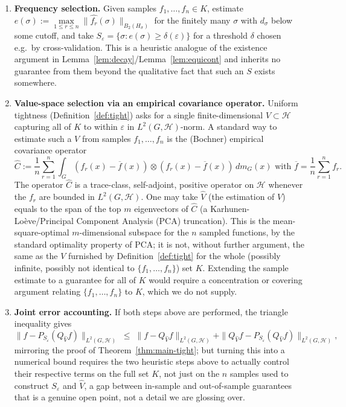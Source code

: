 \documentclass[11pt]{amsart}
\begin{document}
\begin{enumerate}
\item \textbf{Frequency selection.} Given samples $f_1,\dots,f_n\in K$, estimate
$e(\sigma) := \max\limits_{1\le r\le n} \|\widehat{f_r}(\sigma)\|_{B_2(H_\sigma)}$
for the finitely many $\sigma$ with $d_\sigma$ below some cutoff, and take
$S_\varepsilon = \{\sigma : e(\sigma) \ge \delta(\varepsilon)\}$ for a
threshold $\delta$ chosen e.g.\ by cross-validation. This is a heuristic
analogue of the existence argument in Lemma~\ref{lem:decay}/Lemma~\ref{lem:equicont} and inherits no
guarantee from them beyond the qualitative fact that such an $S$ exists
somewhere.

\item \textbf{Value-space selection via an empirical covariance operator.}
Uniform tightness (Definition~\ref{def:tight}) asks for a single finite-dimensional
$V\subset \mathcal{H}$ capturing all of $K$ to within $\varepsilon$ in $L^2(G,\mathcal{H})$-norm. A standard way to estimate such a $V$ from samples
$f_1,\dots,f_n$ is the (Bochner) empirical covariance operator
$$
\widehat{C} := \frac{1}{n}\sum_{r=1}^n \int_G (f_r(x)-\overline{f}(x))\otimes
(f_r(x)-\overline{f}(x))\, dm_G(x) \text{ with }   \overline{f}  = \frac{1}{n}\sum\limits_{r=1}^n f_r.
$$
The operator $\widehat{C}$ is a trace-class, self-adjoint, positive operator on $\mathcal{H}$ whenever the $f_r$
are bounded in $L^2(G,\mathcal{H})$. One may   take $\widehat{V}$ (the estimation of $V$) equals to the  span of the  top $m$
eigenvectors of $\widehat{C}$ (a Karhunen-Lo\`eve/Principal Component Analysis (PCA) truncation)\cite{karhunen1947,loeve1948}. This is the
mean-square-optimal $m$-dimensional subspace for the $n$ sampled
functions, by the standard optimality property of PCA; it is not, without
further argument, the same as the $V$ furnished by Definition~\ref{def:tight} for the
whole (possibly infinite, possibly not identical to $\{f_1,\dots,f_n\}$)
set $K$. Extending the sample estimate to a guarantee for all of $K$ would
require a concentration or covering argument relating $\{f_1,\dots,f_n\}$
to $K$, which we do not supply.

\item \textbf{Joint error accounting.} 
If both steps above are performed, the
triangle inequality gives
$$
\|f - P_{S_\varepsilon}(Q_{\widehat V} f)\|_{L^2(G,\mathcal{H})}
\;\le\; \|f - Q_{\widehat V}f\|_{L^2(G,\mathcal{H})} + \|Q_{\widehat V}f -
P_{S_\varepsilon}(Q_{\widehat V}f)\|_{L^2(G,\mathcal{H})},
$$
mirroring the proof of Theorem~\ref{thm:main-tight}; but turning this into a numerical
bound requires the two heuristic steps above to actually control their
respective terms on the full set $K$, not just on the $n$ samples
used to construct $S_\varepsilon$ and $\widehat{V}$,  a gap between
in-sample and out-of-sample guarantees that is a genuine open point, not a
detail we are glossing over.
\end{enumerate}
\end{document}
